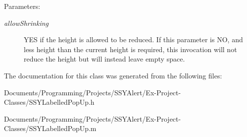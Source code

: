 \begin{Desc}
\item[Parameters:]
\begin{description}
\item[{\em allowShrinking}]YES if the height is allowed to be reduced. If this parameter is NO, and less height than the current height is required, this invocation will not reduce the height but will instead leave empty space. \end{description}
\end{Desc}


The documentation for this class was generated from the following files:\begin{CompactItemize}
\item 
Documents/Programming/Projects/SSYAlert/Ex-Project-Classes/SSYLabelledPopUp.h\item 
Documents/Programming/Projects/SSYAlert/Ex-Project-Classes/SSYLabelledPopUp.m\end{CompactItemize}
